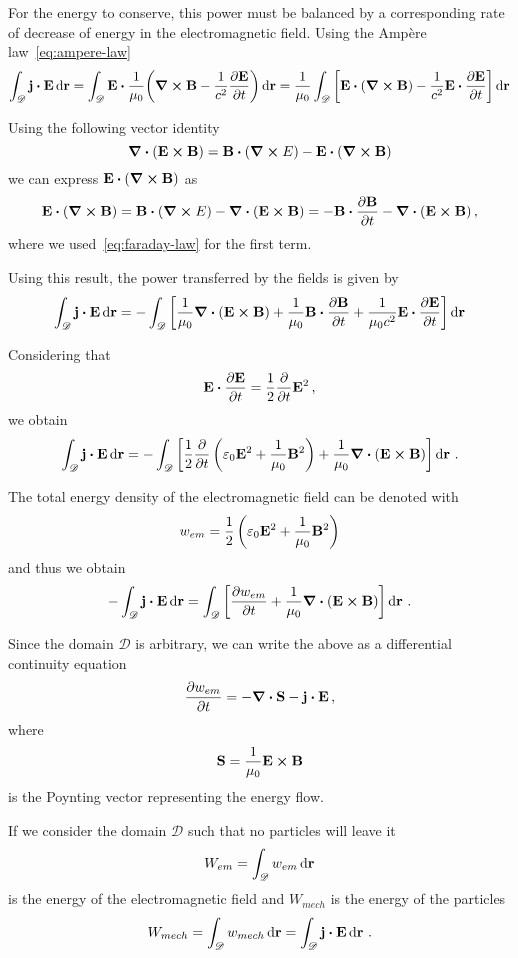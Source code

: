 \documentclass[12pt, class=report, crop=false]{standalone}
\begin{document}
For the energy to conserve, this power must be balanced by a corresponding
rate of decrease of energy in the electromagnetic field.
Using the Ampère law~\eqref{eq:ampere-law}
\[
  \int_{\mathscr{D}} \vb{j} \vdot \vb{E} \dd{\vb{r}} =
  \int_{\mathscr{D}} \vb{E} \vdot \frac{1}{\mu_0} \qty(\curl{\vb{B}} - \frac{1}{c^2} \pdv{\vb{E}}{t}) \dd{\vb{r}} =
  \frac{1}{\mu_0} \int_{\mathscr{D}} \left[\vb{E} \vdot(\curl{\vb{B}}) -
    \frac{1}{c^2} \vb{E} \vdot \pdv{\vb{E}}{t} \right] \dd{\vb{r}}
\]

Using the following vector identity
\[
  \div(\vb{E} \cp \vb{B}) = \vb{B} \vdot (\curl{E}) - \vb{E} \vdot (\curl{\vb{B}})
\]
we can express \(\vb{E} \vdot(\curl{\vb{B}})\) as
\[
  \vb{E} \vdot(\curl{\vb{B}}) = \vb{B} \vdot (\curl{E}) - \div(\vb{E} \cp \vb{B}) =
  - \vb{B} \vdot \pdv{\vb{B}}{t} - \div(\vb{E} \cp \vb{B})\,,
\]
where we used~\eqref{eq:faraday-law} for the first term.

Using this result, the power transferred by the fields is given by
\[
  \int_{\mathscr{D}} \vb{j} \vdot \vb{E} \dd{\vb{r}} =
  -\int_{\mathscr{D}} \left[\frac{1}{\mu_0} \div(\vb{E} \cp \vb{B}) + \frac{1}{\mu_0} \vb{B} \vdot \pdv{\vb{B}}{t} +
    \frac{1}{\mu_0 c^2} \vb{E} \vdot \pdv{\vb{E}}{t} \right] \dd{\vb{r}}
\]

Considering that
\[
  \vb{E} \vdot \pdv{\vb{E}}{t} = \frac{1}{2} \pdv{t} \vb{E}^2\,,
\]
we obtain
\[
  \int_{\mathscr{D}} \vb{j} \vdot \vb{E} \dd{\vb{r}} =
  -\int_{\mathscr{D}} \left[ \frac{1}{2} \pdv{t}
    \left( \varepsilon_0 \vb{E}^2 + \frac{1}{\mu_0}\vb{B}^2 \right)
  + \frac{1}{\mu_0}\div(\vb{E} \cp \vb{B}) \right] \dd{\vb{r}}\,.
\]

The total energy density of the electromagnetic field can be denoted with
\[
  w_{em} = \frac{1}{2} \left( \varepsilon_0 \vb{E}^2 + \frac{1}{\mu_0}\vb{B}^2 \right)
\]
and thus we obtain
\[
  -\int_{\mathscr{D}} \vb{j} \vdot \vb{E} \dd{\vb{r}} =
  \int_{\mathscr{D}} \left[ \pdv{w_{em}}{t} +
  \frac{1}{\mu_0}\div(\vb{E} \cp \vb{B}) \right] \dd{\vb{r}}\,.
\]

Since the domain \(\mathscr{D}\) is arbitrary, we can write the above as a
differential continuity equation
\begin{equation}
  \label{eq:poynting-theorem-local}
  \pdv{w_{em}}{t} = - \div{\vb{S}} - \vb{j} \vdot \vb{E}\,,
\end{equation}
where
\[
  \vb{S} = \frac{1}{\mu_0} \vb{E} \cp \vb{B}
\]
is the Poynting vector representing the energy flow.

If we consider the domain \(\mathscr{D}\) such that no particles will leave it
\[
  W_{em} = \int_{\mathscr{D}} w_{em} \dd{\vb{r}}
\]
is the energy of the electromagnetic field and \(W_{mech}\) is the
energy of the particles
\[
  W_{mech} = \int_{\mathscr{D}} w_{mech} \dd{\vb{r}} =
  \int_{\mathscr{D}} \vb{j} \vdot \vb{E} \dd{\vb{r}}\,.
\]
\end{document}
